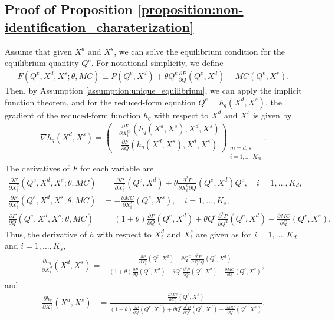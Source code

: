 \documentclass[11pt, a4paper]{article}
\theoremstyle{remark}
\begin{document}
\subsection{Proof of Proposition \ref{proposition:non-identification_charaterization}}
Assume that given $X^{d}$ and $X^{s}$, we can solve the equilibrium condition for the equilibrium quantity $Q^e$.
For notational simplicity, we define
\begin{align}
    F(Q^e, X^{d}, X^{s}; \theta, MC) \equiv P(Q^e, X^{d}) + \theta Q^e\frac{\partial P}{\partial Q}(Q^e, X^{d}) - MC(Q^e, X^{s}).
\end{align}
Then, by Assumption \ref{assumption:unique_equilibrium}, we can apply the implicit function theorem, and for the reduced-form equation $Q^e = h_q(X^{d}, X^{s})$, the gradient of the reduced-form function $h_q$ with respect to $X^{d}$ and $X^{s}$ is given by
\begin{align}
    \nabla h_q(X^{d}, X^{s}) =  \left( -\dfrac{\frac{\partial F}{\partial X^{m}_{i}}(h_q(X^{d}, X^{s}), X^{d}, X^{s})}{\frac{\partial F}{\partial Q}(h_q(X^{d}, X^{s}), X^{d}, X^{s})} \right)_{\substack{m = d, s\\ i = 1, \ldots, K_m}}. \label{eq:foc_derivative_demand_supply}
\end{align}
The derivatives of $F$ for each variable are
\begin{align}
    \frac{\partial F}{\partial X^{d}_i}(Q^e, X^{d}, X^{s}; \theta, MC) & =  \frac{\partial P}{\partial X^{d}_{i}}(Q^e, X^{d}) + \theta\frac{\partial^2 P}{\partial X^{d}_{i}\partial Q}(Q^e, X^{d})Q^e, \quad i = 1, \ldots, K_d,\\
    \frac{\partial F}{\partial X^{s}_i}(Q^e, X^{d}, X^{s}; \theta, MC) & =  -\frac{\partial MC}{\partial X^{s}_{i}}(Q^e, X^{s}), \quad i = 1, \ldots, K_s, \\
    \frac{\partial F}{\partial Q}(Q^e, X^{d}, X^{s}; \theta, MC) & = (1+\theta)\frac{\partial P}{\partial Q}(Q^e, X^{d}) + \theta Q^e\frac{\partial^2 P}{\partial Q^2}(Q^e, X^{d}) - \frac{\partial MC}{\partial Q}(Q^e, X^{s}).
\end{align}
Thus, the derivative of $h$ with respect to $X^{d}_i$ and $X^{s}_i$ are given as for $i = 1, \ldots, K_d$ and $i = 1, \ldots, K_s$,
\begin{align}
    \frac{\partial h_q}{\partial X^{d}_{i}}(X^{d}, X^{s}) = -\frac{\frac{\partial P}{\partial X^{d}_{i}}(Q^e, X^{d}) + \theta Q^e \frac{\partial^2 P}{\partial X^{d}_{i}\partial Q}(Q^e, X^{d}) }{(1+\theta)\frac{\partial P}{\partial Q}(Q^e, X^{d}) + \theta  Q^e\frac{\partial^2 P}{\partial Q^2}(Q^e, X^{d}) - \frac{\partial MC}{\partial Q}(Q^e, X^{s})}, \label{eq:foc_derivative_demand}
\end{align}
and
\begin{align}
    \frac{\partial h_q}{\partial X^{s}_{i}}(X^{d}, X^{s}) & = \frac{\frac{\partial MC}{\partial X^{s}_{i}}(Q^e, X^{s})}{(1+\theta)\frac{\partial P}{\partial Q}(Q^e, X^{d}) + \theta  Q^e\frac{\partial^2 P}{\partial Q^2}(Q^e, X^{d}) - \frac{\partial MC}{\partial Q}(Q^e, X^{s})}. \label{eq:foc_derivative_supply}
\end{align}
\end{document}

